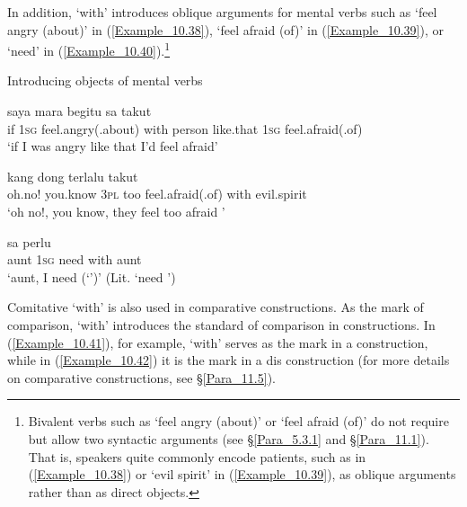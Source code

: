 In addition,   ‘with’ introduces oblique arguments for mental verbs such as  ‘feel angry (about)’ in (\ref{Example_10.38}),  ‘feel afraid (of)’ in (\ref{Example_10.39}), or  ‘need’ in (\ref{Example_10.40}).\footnote{Bivalent verbs such as  ‘feel angry (about)’ or  ‘feel afraid (of)’ do not require but allow two syntactic arguments (see §\ref{Para_5.3.1} and §\ref{Para_11.1}). That is, speakers quite commonly encode patients, such as  in (\ref{Example_10.38}) or  ‘evil spirit’ in (\ref{Example_10.39}), as oblique arguments rather than as direct objects.}


\begin{styleExampleTitle}
Introducing objects of mental verbs
\end{styleExampleTitle}

\ea
\label{Example_10.38}
 {saya} {mara} {} {} {begitu} {sa} {takut}\\ %
 if  \textsc{1sg}  feel.angry(.about)  with  person  like.that  \textsc{1sg}  feel.afraid(.of)\\
\glt 
‘if I was angry  like that I’d feel afraid’ \textstyleExampleSource{[081110-008-CvNP.0067]}
\z

\ea
\label{Example_10.39}
 {kang} {dong} {terlalu} {takut} {} {}\\ %
 oh.no!  you.know  \textsc{3pl}  too  feel.afraid(.of)  with  evil.spirit\\
\glt 
‘oh no!, you know, they feel too afraid ’ \textstyleExampleSource{[081025-006-Cv.0198]}
\z

\ea
\label{Example_10.40}
 {sa} {perlu} {} {}\\ %
 aunt  \textsc{1sg}  need  with  aunt\\
\glt 
‘aunt, I need  (‘’)’ (Lit. ‘need ’) \textstyleExampleSource{[081014-004-Cv.0004]}
\z


Comitative  ‘with’ is also used in comparative constructions. As the mark of comparison,  ‘with’ introduces the standard of comparison in  constructions. In (\ref{Example_10.41}), for example,  ‘with’ serves as the mark in a  construction, while in (\ref{Example_10.42}) it is the mark in a dis construction (for more details on comparative constructions, see §\ref{Para_11.5}).


